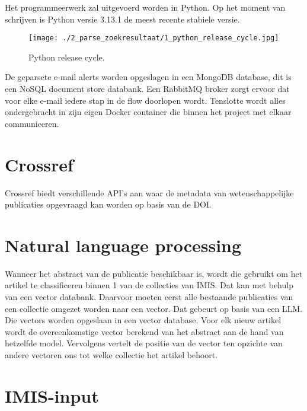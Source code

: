 Het programmeerwerk zal uitgevoerd worden in Python. Op het moment van schrijven is Python versie 3.13.1 de meest recente stabiele versie.
\begin{figure}[H]
    \centering
    \texttt{[image: ./2\_parse\_zoekresultaat/1\_python\_release\_cycle.jpg]}
    \caption[Python release cycle.]{\label{fig:Python release cycle}Python release cycle.\autocite{pythonreleasecycle2025}}
\end{figure}
\FloatBarrier
De geparsete e-mail alerts worden opgeslagen in een MongoDB database, dit is een NoSQL document store databank. Een RabbitMQ broker zorgt ervoor dat voor elke e-mail iedere stap in de flow doorlopen wordt. Tenslotte wordt alles ondergebracht in zijn eigen Docker container die binnen het project met elkaar communiceren.
\section{Crossref}
Crossref biedt verschillende API's aan waar de metadata van wetenschappelijke publicaties opgevraagd kan worden op basis van de DOI.
\section{Natural language processing}
Wanneer het abstract van de publicatie beschikbaar is, wordt die gebruikt om het artikel te classificeren binnen 1 van de collecties van IMIS. Dat kan met behulp van een vector databank. Daarvoor moeten eerst alle bestaande publicaties van een collectie omgezet worden naar een vector. Dat gebeurt op basis van een LLM. Die vectors worden opgeslaan in een vector database. Voor elk nieuw artikel wordt de overeenkomstige vector berekend van het abstract aan de hand van hetzelfde model. Vervolgens vertelt de positie van de vector ten opzichte van andere vectoren ons tot welke collectie het artikel behoort.
\section{IMIS-input}
\lipsum[1-1]



